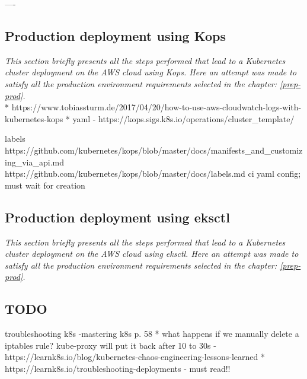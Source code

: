 ----



\subsection{Production deployment using Kops}
\textit{This section briefly presents all the steps performed that lead to a Kubernetes cluster deployment on the AWS cloud using Kops. Here an attempt was made to satisfy all the production environment requirements selected in the chapter: \ref{prep-prod}.}
\\




* https://www.tobiassturm.de/2017/04/20/how-to-use-aws-cloudwatch-logs-with-kubernetes-kops
* yaml - https://kops.sigs.k8s.io/operations/cluster_template/


labels https://github.com/kubernetes/kops/blob/master/docs/manifests_and_customizing_via_api.md https://github.com/kubernetes/kops/blob/master/docs/labels.md
ci yaml config; must wait for creation

\subsection{Production deployment using eksctl}
\textit{This section briefly presents all the steps performed that lead to a Kubernetes cluster deployment on the AWS cloud using eksctl. Here an attempt was made to satisfy all the production environment requirements selected in the chapter: \ref{prep-prod}.}
\\

\subsection{TODO}

troubleshooting k8s -mastering k8s p. 58
* what happens if we manually delete a iptables rule? kube-proxy will put it back after 10 to 30s - https://learnk8s.io/blog/kubernetes-chaos-engineering-lessons-learned
* https://learnk8s.io/troubleshooting-deployments - must read!!
